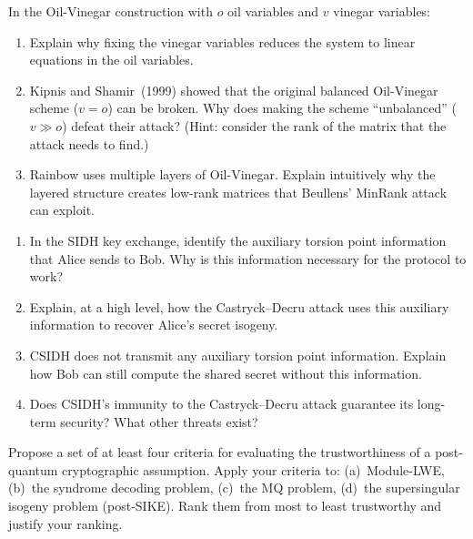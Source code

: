 \begin{prob}
\label{prob:ch11-ov}
In the Oil-Vinegar construction with $o$ oil variables and $v$ vinegar variables:
\begin{enumerate}
\item[(a)] Explain why fixing the vinegar variables reduces the system to linear equations in the oil variables.
\item[(b)] Kipnis and Shamir~(1999) showed that the original balanced Oil-Vinegar scheme ($v = o$) can be broken.  Why does making the scheme ``unbalanced'' ($v \gg o$) defeat their attack?  (Hint: consider the rank of the matrix that the attack needs to find.)
\item[(c)] Rainbow uses multiple layers of Oil-Vinegar.  Explain intuitively why the layered structure creates low-rank matrices that Beullens' MinRank attack can exploit.
\end{enumerate}
\end{prob}

\begin{prob}
\label{prob:ch11-sike}
\begin{enumerate}
\item[(a)] In the SIDH key exchange, identify the auxiliary torsion point information that Alice sends to Bob.  Why is this information necessary for the protocol to work?
\item[(b)] Explain, at a high level, how the Castryck--Decru attack uses this auxiliary information to recover Alice's secret isogeny.
\item[(c)] CSIDH does not transmit any auxiliary torsion point information.  Explain how Bob can still compute the shared secret without this information.
\item[(d)] Does CSIDH's immunity to the Castryck--Decru attack guarantee its long-term security?  What other threats exist?
\end{enumerate}
\end{prob}

\begin{prob}
\label{prob:ch11-trust}
Propose a set of at least four criteria for evaluating the trustworthiness of a post-quantum cryptographic assumption.  Apply your criteria to: (a)~Module-LWE, (b)~the syndrome decoding problem, (c)~the MQ problem, (d)~the supersingular isogeny problem (post-SIKE).  Rank them from most to least trustworthy and justify your ranking.
\end{prob}


